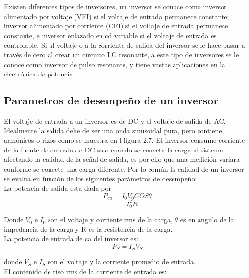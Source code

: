 Existen diferentes tipos de inversores, un inversor se conoce como inversor alimentado por voltaje (VFI) si el voltaje de entrada permanece constante; inversor alimentado por corriente (CFI) si el voltaje de entrada permanece constante, e inversor enlazado en cd variable si el voltaje de entrada es controlable. Si al voltaje o a la corriente de salida del inversor se le hace pasar a través de cero al crear un circuito LC resonante, a este tipo de inversores se le conoce como inversor de pulso resonante, y tiene vastas aplicaciones en la electrónica de potencia. \\

\subsection{Parametros de desempeño de un inversor}

El voltaje de entrada a un inversor es de DC y el voltaje de salida de AC. Idealmente la salida debe de ser una onda sinusoidal pura, pero contiene armónicos o rizos como se muestra en l figura 2.7. El inversor consume corriente de la fuente de entrada de DC solo cuando se conecta la carga al sistema, afectando la calidad de la señal de salida, es por ello que una medición variara conforme se conecte una carga diferente. Por lo común la calidad de un inversor se evalúa en función de los siguientes parámetros de desempeño:\\

La potencia de salida esta dada por \begin{equation}
P_{ca}=I_{0}V_{0}COS\theta
\end{equation}
\begin{equation}
= I_{0}^{2}R
\end{equation}

Donde $V_{0}$ e $I_{0}$ son el voltaje y corriente rms de la carga, $\theta$ es en angulo de la impedancia de la carga y R es la resistencia de la carga.\\

La potencia de entrada de ca del inversor es:\\

\begin{equation}
P_{S}=I_{S}V_{S}
\end{equation}

donde $V_{S}$ e $I_{S}$ son el voltaje y la corriente promedio de entrada.\\

El contenido de riso rms de la corriente de entrada es:

